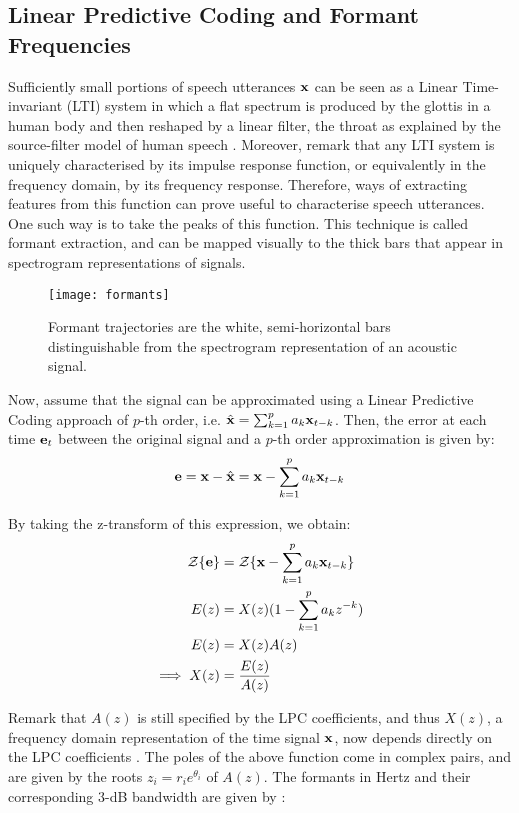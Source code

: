\documentclass[../main.tex]{subfiles} \label{chapter_soa}
\begin{document}
\subsection{Linear Predictive Coding and Formant Frequencies} \label{subsection_formants}
Sufficiently small portions of speech utterances $\mathbf{x}$ can be seen as a Linear Time-invariant (LTI) system in which a flat spectrum is produced by the glottis in a human body and then reshaped by a linear filter, the throat as explained by the source-filter model of human speech \cite{Bello}. Moreover, remark that any LTI system is uniquely characterised by its impulse response function, or equivalently in the frequency domain, by its frequency response\cite{markel1976}. Therefore, ways of extracting features from this function can prove useful to characterise speech utterances. One such way is to take the peaks of this function. This technique is called formant extraction, and can be mapped visually to the thick bars that appear in spectrogram representations of signals.
\begin{figure}[t]
\centering
\texttt{[image: formants]}
\caption{Formant trajectories are the white, semi-horizontal bars distinguishable from the spectrogram representation of an acoustic signal.}
\label{fig_formants}
\end{figure}
\par Now, assume that the signal can be approximated using a Linear Predictive Coding approach of $p$-th order, i.e. $\hat{\mathbf{x}} = \sum_{k=1}^pa_k\mathbf{x}_{t-k}$. Then, the error at each time $\mathbf{e}_t$ between the original signal and a $p$-th order approximation is given by: 
\begin{align*}
\mathbf{e} = \mathbf{x} - \hat{\mathbf{x}} = \mathbf{x} - \sum_{k=1}^p{a_k \mathbf{x}_{t-k}}
\end{align*} 
\par By taking the z-transform of this expression, we obtain:
\begin{align*}
\mathcal{Z}\{\mathbf{e}\} &= \mathcal{Z}\{\mathbf{x} - \sum_{k=1}^p{a_k \mathbf{x}_{t-k}}\}\\
E(z) &= X(z)(1-\sum_{k=1}^p{a_k z^{-k}})\\
E(z) &= X(z)A(z)\\
\implies X(z) &= \frac{E(z)}{A(z)}
\end{align*}
\par Remark that $A(z)$ is still specified by the LPC coefficients, and thus $X(z)$, a frequency domain representation of the time signal $\mathbf{x}$, now depends directly on the LPC coefficients \cite{Hosom2006}. The poles of the above function come in complex pairs, and are given by the roots $z_i = r_ie^{\theta_i}$ of $A(z)$. The formants in Hertz and their corresponding 3-dB bandwidth are given by \cite{Snell1993,Mathworks2015}:
\end{document}
